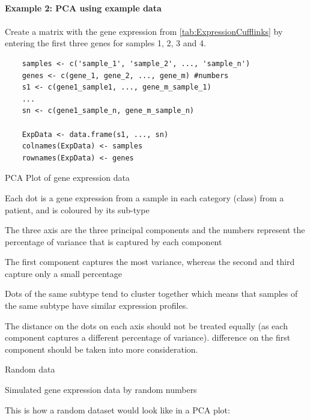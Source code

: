 \documentclass[11pt, oneside]{article}   	%
\begin{document}
\paragraph{Example 2: PCA using example data}
\paragraph{}

Create a matrix with the gene expression from \autoref{tab:ExpressionCufflinks} by entering the first three genes for samples 1, 2, 3 and 4.

\begin{framed}
\begin{verbatim}
	samples <- c('sample_1', 'sample_2', ..., 'sample_n')
	genes <- c(gene_1, gene_2, ..., gene_m) #numbers
	s1 <- c(gene1_sample1, ..., gene_m_sample_1)
	...
	sn <- c(gene1_sample_n, gene_m_sample_n)

	ExpData <- data.frame(s1, ..., sn)
	colnames(ExpData) <- samples
	rownames(ExpData) <- genes
\end{verbatim}
\end{framed}


PCA Plot of gene expression data 

Each dot is a gene expression from a sample in each category (class) from a patient, and is coloured by its sub-type

The three axis are the three principal components 
and the numbers represent the percentage of variance that is captured by each component

The first component captures the most variance, whereas the second and third capture only a small percentage

Dots of the same subtype tend to cluster together which means that samples of the same subtype have similar expression profiles.

The distance on the dots on each axis should not be treated equally (as each component captures a different percentage of variance). difference on the first component should be taken into more consideration.



 Random data

Simulated gene expression data by random numbers

This is how a random dataset would look like in a PCA plot:
\end{document}

